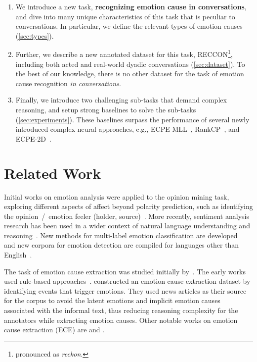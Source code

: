 \documentclass[smallextended]{svjour3}
\newcommand\RECCON{recognizing emotion cause in conversations} \newcommand\ECRIC{ECRIC}
\newcommand\RECCONDA{RECCON}
\newcommand\0{\hphantom{0}}
\begin{document}
\begin{enumerate}

    \item We introduce a new task, \textbf{\RECCON{}}, and dive into many unique characteristics of this task that is peculiar to conversations. 
In particular, we define the relevant types of emotion causes (\cref{sec:types}). 
     
     \item 
     Further, 
     we describe a new annotated dataset for this task, \RECCONDA{}\footnote{pronounced as \textit{reckon}.}, including both acted and real-world dyadic conversations (\cref{sec:dataset}). To the best of our knowledge, there is no other dataset for the task of emotion cause recognition \emph{in conversations}.
     
     \item 
Finally, 
     we introduce two challenging sub-tasks that demand complex reasoning, and 
setup strong baselines to solve the sub-tasks (\cref{sec:experiments}). These baselines surpass the performance of several newly introduced complex neural approaches, e.g., ECPE-MLL~\cite{DBLP:conf/emnlp/DingXY20}, RankCP~\cite{wei-etal-2020-effective},  and ECPE-2D~\cite{DBLP:conf/acl/DingXY20}.
\end{enumerate}

\section{Related Work} \label{sec:related_works}

Initial works on emotion analysis were applied to the opinion mining task, exploring different aspects of affect beyond polarity prediction, such as identifying the opinion~/~emotion feeler (holder, source)~\cite{das-bandyopadhyay-2010-finding,DBLP:conf/naacl/ChoiCRP05}.
More recently, sentiment analysis research has been used in a wider context of natural language understanding and reasoning~\citep{OntoSenticNet2}.
New methods for multi-label emotion classification are developed~\cite{Iqra} and new corpora for emotion detection are compiled for languages other than English~\cite{LiSSS}.

The task of emotion cause extraction was 
studied initially by~\citet{lee-etal-2010-text}. 
The early works 
used 
rule-based
approaches~\cite{chen-etal-2010-emotion}. \citet{gui2016event} constructed an emotion cause extraction dataset by identifying events that trigger emotions. They used news articles as their source for the corpus to avoid the latent emotions and implicit emotion causes associated with the informal text, thus reducing reasoning complexity for the annotators while extracting emotion causes. Other notable works on emotion cause extraction (ECE) are \citep{DBLP:conf/cicling/GhaziIS15} and \citep{gao2017overview}.
\end{document}

